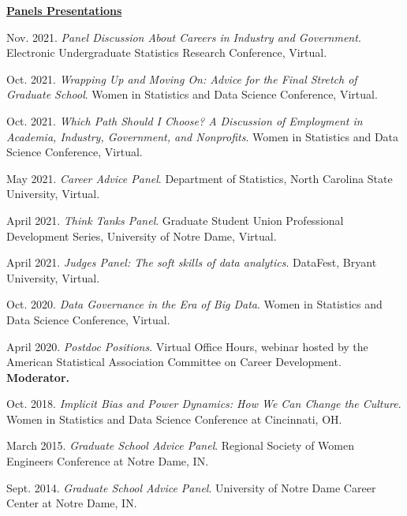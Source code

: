 \documentclass[11pt, letterpaper, roman]{moderncv} %
\begin{document}
\begin{etaremune}[topsep=0pt, itemsep=3pt, partopsep=0pt, parsep=0pt]
\vspace{6pt}
\hspace{-0.30in}\underline{\textbf{\large Panels Presentations}}\normalsize
    \item Nov. 2021. \textit{Panel Discussion About Careers in Industry and Government}. Electronic Undergraduate Statistics Research Conference, Virtual.

    \item Oct. 2021. \textit{Wrapping Up and Moving On: Advice for the Final Stretch of Graduate School}. Women in Statistics and Data Science Conference, Virtual.
    
    \item Oct. 2021. \textit{Which Path Should I Choose? A Discussion of Employment in Academia, Industry, Government, and Nonprofits}. Women in Statistics and Data Science Conference, Virtual.

    \item May 2021. \textit{Career Advice Panel}. Department of Statistics, North Carolina State University, Virtual.
    
    \item April 2021. \textit{Think Tanks Panel}. Graduate Student Union Professional Development Series, University of Notre Dame, Virtual.
    
    \item April 2021. \textit{Judges Panel: The soft skills of data analytics}. DataFest, Bryant University, Virtual.
    
    \item Oct. 2020. \textit{Data Governance in the Era of Big Data}. Women in Statistics and Data Science Conference, Virtual.
    
    \item April 2020. \textit{Postdoc Positions}. Virtual Office Hours, webinar hosted by the American Statistical Association Committee on Career Development. \textbf{Moderator.}
    
    \item Oct. 2018. \textit{Implicit Bias and Power Dynamics: How We Can Change the Culture}. Women in Statistics and Data Science Conference at Cincinnati, OH.
    
    \item March 2015. \textit{Graduate School Advice Panel}.  Regional Society of Women Engineers Conference at Notre Dame, IN.
    
    \item Sept. 2014. \textit{Graduate School Advice Panel}.  University of Notre Dame Career Center at Notre Dame, IN.
    

\end{etaremune}
\end{document}
